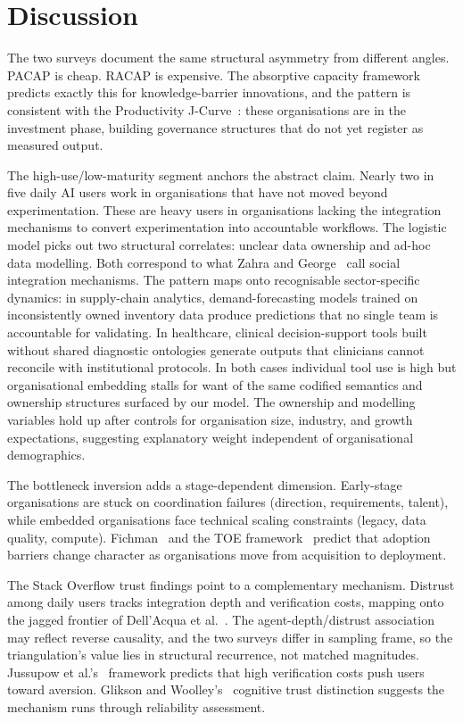 \documentclass[twocolumn]{article}
\begin{document}
\section{Discussion}

The two surveys document the same structural asymmetry from different angles. PACAP is cheap. RACAP is expensive. The absorptive capacity framework predicts exactly this for knowledge-barrier innovations, and the pattern is consistent with the Productivity J-Curve~\cite{brynjolfsson2021productivity}: these organisations are in the investment phase, building governance structures that do not yet register as measured output.

The high-use/low-maturity segment anchors the abstract claim. Nearly two in five daily AI users work in organisations that have not moved beyond experimentation. These are heavy users in organisations lacking the integration mechanisms to convert experimentation into accountable workflows. The logistic model picks out two structural correlates: unclear data ownership and ad-hoc data modelling. Both correspond to what Zahra and George~\cite{zahra2002absorptive} call social integration mechanisms. The pattern maps onto recognisable sector-specific dynamics: in supply-chain analytics, demand-forecasting models trained on inconsistently owned inventory data produce predictions that no single team is accountable for validating. In healthcare, clinical decision-support tools built without shared diagnostic ontologies generate outputs that clinicians cannot reconcile with institutional protocols. In both cases individual tool use is high but organisational embedding stalls for want of the same codified semantics and ownership structures surfaced by our model. The ownership and modelling variables hold up after controls for organisation size, industry, and growth expectations, suggesting explanatory weight independent of organisational demographics.

The bottleneck inversion adds a stage-dependent dimension. Early-stage organisations are stuck on coordination failures (direction, requirements, talent), while embedded organisations face technical scaling constraints (legacy, data quality, compute). Fichman~\cite{fichman2004real} and the TOE framework~\cite{tornatzky1990processes} predict that adoption barriers change character as organisations move from acquisition to deployment.

The Stack Overflow trust findings point to a complementary mechanism. Distrust among daily users tracks integration depth and verification costs, mapping onto the jagged frontier of Dell'Acqua et al.~\cite{dellacqua2023navigating}. The agent-depth/distrust association may reflect reverse causality, and the two surveys differ in sampling frame, so the triangulation's value lies in structural recurrence, not matched magnitudes. Jussupow et al.'s~\cite{jussupow2024algorithm} framework predicts that high verification costs push users toward aversion. Glikson and Woolley's~\cite{glikson2020human} cognitive trust distinction suggests the mechanism runs through reliability assessment.
\end{document}

